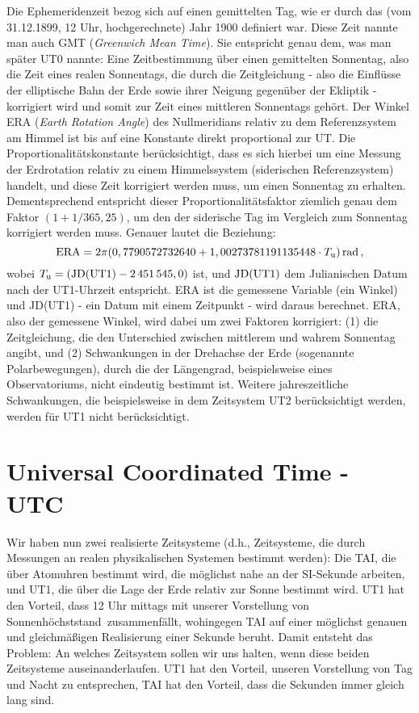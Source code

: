 Die Ephemeridenzeit bezog sich auf einen gemittelten Tag, wie er durch das (vom 31.12.1899, 12 Uhr, hochgerechnete) Jahr 1900 definiert war. 
Diese Zeit nannte man auch GMT (\textit{Greenwich Mean Time}). Sie entspricht genau
dem, was man sp\"ater UT0 nannte: Eine Zeitbestimmung \"uber einen gemittelten Sonnentag, also die Zeit
eines realen Sonnentags, die durch die Zeitgleichung - also die Einfl\"usse der elliptische Bahn der Erde sowie ihrer Neigung
gegen\"uber der Ekliptik - korrigiert wird und somit zur Zeit eines mittleren Sonnentags geh\"ort. 
Der Winkel ERA (\textit{Earth Rotation Angle}) 
des Nullmeridians relativ zu dem Referenzsystem am Himmel  
ist bis auf eine Konstante direkt proportional zur UT. Die Proportionalit\"atskonstante ber\"ucksichtigt, dass es sich
hierbei um eine Messung der Erdrotation relativ zu einem Himmelssystem (siderischen Referenzsystem)
handelt, und diese Zeit korrigiert werden muss, um einen Sonnentag zu erhalten. Dementsprechend entspricht
dieser Proportionalit\"atsfaktor ziemlich genau dem Faktor $(1+1/365,25)$, um den der siderische Tag im 
Vergleich zum Sonnentag korrigiert werden muss. Genauer lautet die Beziehung:
\begin{equation}
      {\rm ERA} = 2\pi (0,7790572732640 + 1,00273781191135448 \cdot T_{\rm u}) \, {\rm rad}  \, ,
\end{equation}
wobei $T_{\rm u} = ({\rm JD(UT1)} - 2\,451\,545,0)$ ist, und ${\rm JD(UT1)}$ dem Julianischen Datum
nach der UT1-Uhrzeit entspricht. ERA ist die gemessene Variable (ein Winkel) und JD(UT1) - ein Datum
mit einem Zeitpunkt - wird daraus berechnet. ERA, also der gemessene Winkel, wird dabei um zwei
Faktoren korrigiert: (1) die Zeitgleichung, die den Unterschied zwischen mittlerem und wahrem 
Sonnentag angibt, und (2) Schwankungen in der Drehachse der Erde (sogenannte Polarbewegungen), durch die
der L\"angengrad, beispielsweise eines Observatoriums, nicht eindeutig bestimmt ist. Weitere jahreszeitliche
Schwankungen, die beispielsweise in dem Zeitsystem UT2 ber\"ucksichtigt werden, werden f\"ur UT1 nicht
ber\"ucksichtigt.       

\section{Universal Coordinated Time - UTC}

Wir haben nun zwei realisierte Zeitsysteme (d.h., Zeitsysteme, die durch Messungen an realen physikalischen Systemen bestimmt werden): 
Die TAI, die \"uber Atomuhren bestimmt wird, die m\"oglichst nahe an der SI-Sekunde
arbeiten, und UT1, die \"uber die Lage der Erde relativ zur Sonne bestimmt wird. UT1 hat den Vorteil, dass 12 Uhr
mittags mit unserer Vorstellung von \glqq Sonnenh\"ochststand\grqq\ zusammenf\"allt, wohingegen TAI auf einer
m\"oglichst genauen und gleichm\"a\ss igen Realisierung einer Sekunde beruht. Damit entsteht das Problem:
An welches Zeitsystem sollen wir uns halten, wenn diese beiden Zeitsysteme auseinanderlaufen. UT1 hat den Vorteil,
unseren Vorstellung von Tag und Nacht zu entsprechen, TAI hat den Vorteil, dass die Sekunden immer gleich
lang sind. 

